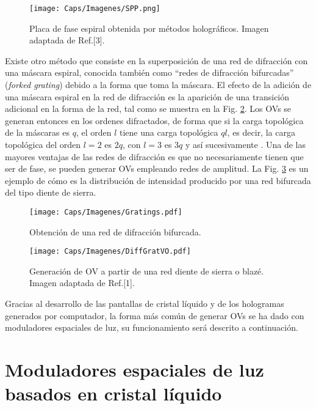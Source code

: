 \begin{figure}[!ht]
  \centering
    \texttt{[image: Caps/Imagenes/SPP.png]}
  \caption[Placa de fase espiral obtenida por métodos holográficos]{Placa de fase espiral obtenida por métodos holográficos. Imagen adaptada de Ref.[3].}
  \label{fig:sppreal}
\end{figure}

Existe otro método que consiste en la superposición de una red de difracción con una máscara espiral, conocida también como ``redes de difracción bifurcadas'' (\textit{forked grating}) debido a la forma que toma la máscara. El efecto de la adición de una máscara espiral en la red de difracción es la aparición de una transición adicional en la forma de la red, tal como se muestra en la Fig. \ref{fig:forkred}. Los OVs se generan entonces en los ordenes difractados, de forma que si la carga topológica de la máscaras es $q$, el orden $l$ tiene una carga topológica $ql$, es decir, la carga topológica del orden $l = 2$ es $2q$, con $l = 3$ es $3q$ y así sucesivamente \cite{Bazhenov1990, Bekshaev2008, Bekshaev2009}. Una de las mayores ventajas de las redes de difracción es que no necesariamente tienen que ser de fase, se pueden generar OVs empleando redes de amplitud. La Fig. \ref{fig:blazedVO} es un ejemplo de cómo es la distribución de intensidad producido por una red bifurcada del tipo diente de sierra.\\

\begin{figure}[!ht]
  \centering
    \texttt{[image: Caps/Imagenes/Gratings.pdf]}
  \caption{Obtención de una red de difracción bifurcada.}
  \label{fig:forkred}
\end{figure}

\begin{figure}[!ht]
  \centering
    \texttt{[image: Caps/Imagenes/DiffGratVO.pdf]}
  \caption[Generación de OV a partir de una red de difracción.]{Generación de OV a partir de una red diente de sierra o blazé. Imagen adaptada de Ref.[1].}
  \label{fig:blazedVO}
\end{figure}

Gracias al desarrollo de las pantallas de cristal líquido y de los hologramas generados por computador, la forma más común de generar OVs se ha dado con moduladores espaciales de luz, su funcionamiento será descrito a continuación.

\section{Moduladores espaciales de luz basados en cristal líquido}
\label{sec:slm}


